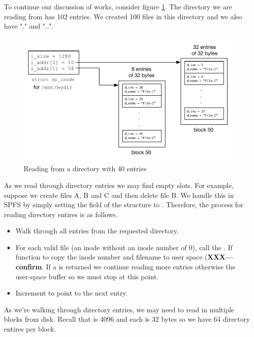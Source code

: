 To continue our discussion of  works, consider figure \ref{fig:readdir}. The directory we are reading from has 102 entries. We created 100 files in this directory and we also have "." and "..".

\begin{figure}
	\centering
	\includegraphics[scale=0.6]{figures/readdir.pdf}
	\caption{Reading from a directory with 40 entries}
	\label{fig:readdir}
\end{figure}

\noindent
As we read through directory entries we may find empty slots. For example, suppose we create files A, B and C and then delete file B. We handle this in SPFS by simply setting the  field of the  structure to . Therefore, the process for reading directory entires is as follows.

\begin{itemize}
	\item Walk through all entries from the requested directory.
	\item For each valid file (an inode without an inode number of 0), call the . If  
		function to copy the inode number and filename to user space ({\bfseries XXX---confirm}. If a 
		is returned we continue reading more entries otherwise the user-space buffer so we must
		stop at this point.
	\item Increment  to point to the next entry.
\end{itemize}

\noindent
As we're walking through directory entries, we may need to read in multiple blocks from disk. Recall that  is 4096 and each  is 32 bytes so we have 64 directory entires per block.

